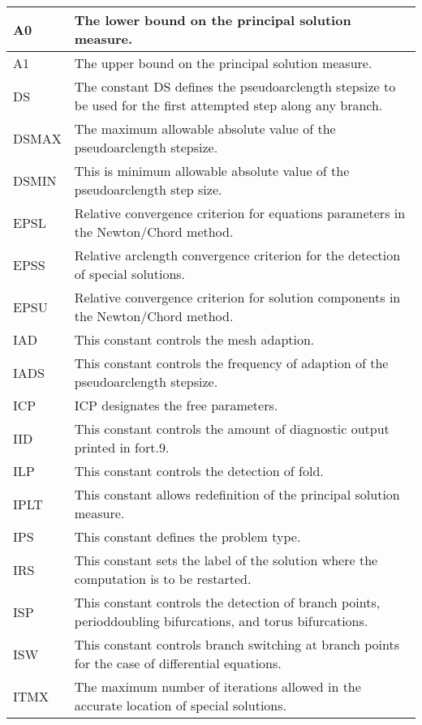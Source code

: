 \documentclass[12pt]{report}
\begin{document}
{\footnotesize
\begin{tabular}{|l|p{5in}|}
\hline 
A0 & 
 The lower bound on the principal solution measure.
\\ \hline 
A1 & 
 The upper bound on the principal solution measure.
\\ \hline 
DS & 
 The constant DS defines the pseudoarclength stepsize to be 
 used for the first attempted step along any branch.
\\ \hline 
DSMAX & 
 The maximum allowable absolute value of the pseudoarclength stepsize.
\\ \hline 
DSMIN & 
 This is minimum allowable absolute value of the pseudoarclength step
 size. 
\\ \hline 
EPSL & 
 Relative convergence criterion for equations parameters in 
 the Newton/Chord method.
\\ \hline 
EPSS & 
 Relative arclength convergence criterion for the detection of special 
 solutions. 
\\ \hline 
EPSU & 
 Relative convergence criterion for solution components in the 
 Newton/Chord method.
\\ \hline 
IAD & 
 This constant controls the mesh adaption.
\\ \hline 
IADS & 
 This constant controls the frequency of adaption of the pseudoarclength
 stepsize.
\\ \hline 
ICP & 
 ICP designates the free parameters.
\\ \hline 
IID & 
 This constant controls the amount of diagnostic output printed in fort.9.
\\ \hline 
ILP & 
 This constant controls the detection of fold.
\\ \hline 
IPLT & 
 This constant allows redefinition of the principal solution measure.
\\ \hline 
IPS & 
 This constant defines the problem type.
\\ \hline 
IRS & 
 This constant sets the label of the solution where the computation is to
 be restarted.
\\ \hline 
ISP & 
 This constant controls the detection of branch points, perioddoubling
 bifurcations, and torus bifurcations.
\\ \hline 
ISW & 
 This constant controls branch switching at branch points for the case of
 differential equations.
\\ \hline 
ITMX & 
 The maximum number of iterations allowed in the accurate location of
 special solutions.
\\ \hline 

\end{tabular}}
\end{document}
